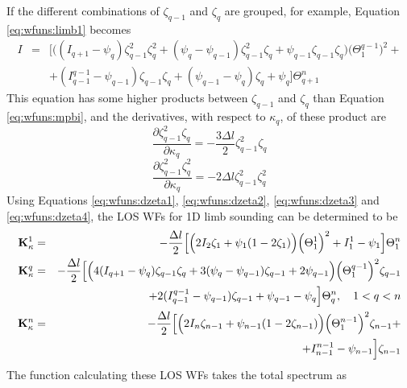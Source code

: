  If the different combinations of $\zeta_{q-1}$ and $\zeta_q$ are 
 grouped, for example, Equation \ref{eq:wfuns:limb1} becomes
 \begin{eqnarray}
   I & = & \Big[\Big((I_{q+1}-\psi_q)\zeta_{q-1}^2\zeta_q^2+(\psi_q-\psi_{q-1})
            \zeta_{q-1}^2\zeta_q + \psi_{q-1}\zeta_{q-1}\zeta_q
            \Big)\Big(\Theta^{q-1}_{1}\Big)^2 + \nonumber \\
    &  &     + (I_{q-1}^{q-1}-\psi_{q-1})\zeta_{q-1}\zeta_q + 
            (\psi_{q-1}-\psi_q)\zeta_q + \psi_q \Big] \Theta^n_{q+1} 
 \end{eqnarray}
 This equation has some higher products between
 $\zeta_{q-1}$ and $\zeta_q$ than Equation \ref{eq:wfuns:mpbi}, and
 the derivatives, with respect to $\kappa_q$, of these product are
 \begin{equation}
   \frac{\partial \zeta_{q-1}^2\zeta_q}{\partial \kappa_q} = 
         -\frac{3\Delta l}{2} \zeta_{q-1}^2\zeta_q
  \label{eq:wfuns:dzeta3}
 \end{equation}
 \begin{equation}
   \frac{\partial \zeta_{q-1}^2\zeta_q^2}{\partial \kappa_q} = 
          -2\Delta l \zeta_{q-1}^2\zeta_q^2
  \label{eq:wfuns:dzeta4}
 \end{equation}
 Using Equations \ref{eq:wfuns:dzeta1}, \ref{eq:wfuns:dzeta2},
 \ref{eq:wfuns:dzeta3} and \ref{eq:wfuns:dzeta4}, the LOS WFs for 1D
 limb sounding can be determined to be
 \begin{eqnarray}
   \mathbf{K}_{\kappa}^1& = & -\frac{\Delta l}{2}\Big[ \Big( 2I_2\zeta_1+\psi_1(1-
       2\zeta_1)\Big) \Big(\Theta^1_1\Big)^2 +I_1^1-\psi_1 \Big]\Theta^n_1
          \nonumber \\
   \mathbf{K}_{\kappa}^q& = & -\frac{\Delta l}{2}\Big[\Big(4(I_{q+1}-\psi_q)
           \zeta_{q-1}\zeta_q+
            3(\psi_q-\psi_{q-1})\zeta_{q-1} + 2 \psi_{q-1}
            \Big) \Big(\Theta^{q-1}_{1}\Big)^2\zeta_{q-1}  \nonumber \\
       &  & + 2(I_{q-1}^{q-1}-\psi_{q-1})\zeta_{q-1} + 
            \psi_{q-1}-\psi_q \Big] \Theta^n_{q}, \quad 1<q<n
  \label{eq:wfuns:loswfs2} \\
   \mathbf{K}_{\kappa}^n& = & -\frac{\Delta l}{2}\Big[\Big( 2I_n\zeta_{n-1}+
         \psi_{n-1}(1-2\zeta_{n-1}) \Big)\Big(\Theta^{n-1}_{1}\Big)^2\zeta_{n-1}+ 
             \nonumber \\   
       & &  + I_{n-1}^{n-1}-\psi_{n-1}\Big] \zeta_{n-1} \nonumber
 \end{eqnarray}
 The function calculating these LOS WFs takes the total spectrum as
